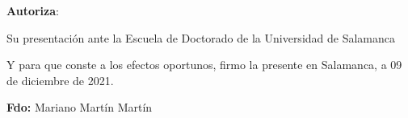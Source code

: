 \bigskip
\textbf{Autoriza}:
\bigskip

Su presentación ante la Escuela de Doctorado de la Universidad de Salamanca

\bigskip

Y para que conste a los efectos oportunos, firmo la presente en Salamanca, a 09 de diciembre de 2021. 

\bigskip

\bigskip

\bigskip

\bigskip

\bigskip

%
%
%
%


\textbf{Fdo:} Mariano Martín Martín 


%	

